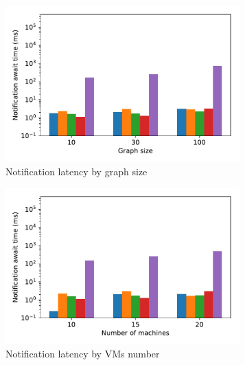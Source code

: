 \begin{figure}[t!]
    \begin{subfigure}[b]{0.3\textwidth}
            \includegraphics[width=0.99\textwidth]{pics/notification_await_time_by_graph_size_bars.pdf}
            \caption{Notification latency by graph size}
            \label{notification_graph}
    \end{subfigure}
    \hspace{5mm}
    \begin{subfigure}[b]{0.3\textwidth}
            \includegraphics[width=0.99\textwidth]{pics/notification_await_time_by_number_of_machines_bars.pdf}
            \caption{Notification latency by VMs number}
            \label{notification_machines}
    \end{subfigure}
    \hspace{5mm}
    \begin{subfigure}[b]{0.3\textwidth}

\end{subfigure}
\end{figure}

